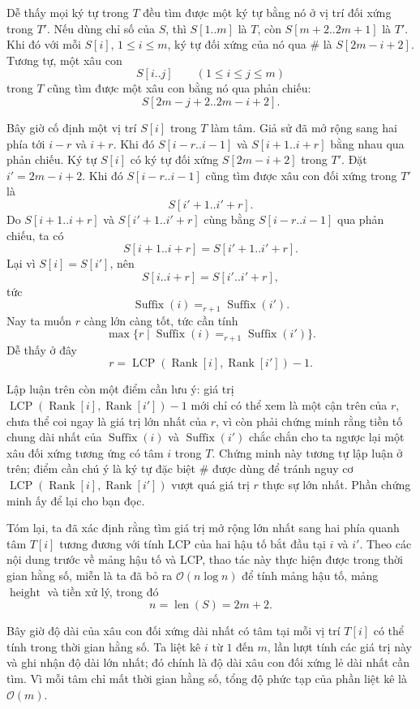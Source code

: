 \documentclass[11pt]{article}
\newcommand{\Oh}{\mathcal{O}}
\newcommand{\Rank}{\operatorname{Rank}}
\newcommand{\Height}{\operatorname{height}}
\newcommand{\Suf}{\operatorname{Suffix}}
\newcommand{\Len}{\operatorname{len}}
\newcommand{\LCP}{\operatorname{LCP}}
\begin{document}
Dễ thấy mọi ký tự trong \(T\) đều tìm được một ký tự bằng nó ở vị trí đối xứng
trong \(T'\). Nếu dùng chỉ số của \(S\), thì \(S[1..m]\) là \(T\), còn
\(S[m+2..2m+1]\) là \(T'\). Khi đó với mỗi \(S[i]\), \(1\le i\le m\), ký tự
đối xứng của nó qua \(\texttt{\#}\) là \(S[2m-i+2]\). Tương tự, một xâu con
\[
  S[i..j]\qquad (1\le i\le j\le m)
\]
trong \(T\) cũng tìm được một xâu con bằng nó qua phản chiếu:
\[
  S[2m-j+2..2m-i+2].
\]

Bây giờ cố định một vị trí \(S[i]\) trong \(T\) làm tâm. Giả sử đã mở rộng
sang hai phía tới \(i-r\) và \(i+r\). Khi đó \(S[i-r..i-1]\) và
\(S[i+1..i+r]\) bằng nhau qua phản chiếu. Ký tự \(S[i]\) có ký tự đối xứng
\(S[2m-i+2]\) trong \(T'\). Đặt \(i'=2m-i+2\). Khi đó
\(S[i-r..i-1]\) cũng tìm được xâu con đối xứng trong \(T'\) là
\[
  S[i'+1..i'+r].
\]
Do \(S[i+1..i+r]\) và \(S[i'+1..i'+r]\) cùng bằng \(S[i-r..i-1]\) qua phản
chiếu, ta có
\[
  S[i+1..i+r]=S[i'+1..i'+r].
\]
Lại vì \(S[i]=S[i']\), nên
\[
  S[i..i+r]=S[i'..i'+r],
\]
tức
\[
  \Suf(i)=_{r+1}\Suf(i').
\]
Nay ta muốn \(r\) càng lớn càng tốt, tức cần tính
\[
  \max\{r\mid \Suf(i)=_{r+1}\Suf(i')\}.
\]
Dễ thấy ở đây
\[
  r=\LCP(\Rank[i],\Rank[i'])-1.
\]

Lập luận trên còn một điểm cần lưu ý: giá trị \(\LCP(\Rank[i],\Rank[i'])-1\)
mới chỉ có thể xem là một cận trên của \(r\), chưa thể coi ngay là giá trị
lớn nhất của \(r\), vì còn phải chứng minh rằng tiền tố chung dài nhất của
\(\Suf(i)\) và \(\Suf(i')\) chắc chắn cho ta ngược lại một xâu đối xứng tương
ứng có tâm \(i\) trong \(T\). Chứng minh này tương tự lập luận ở trên; điểm
cần chú ý là ký tự đặc biệt \(\texttt{\#}\) được dùng để tránh nguy cơ
\(\LCP(\Rank[i],\Rank[i'])\) vượt quá giá trị \(r\) thực sự lớn nhất. Phần
chứng minh ấy để lại cho bạn đọc.

Tóm lại, ta đã xác định rằng tìm giá trị mở rộng lớn nhất sang hai phía quanh
tâm \(T[i]\) tương đương với tính LCP của hai hậu tố bắt đầu tại \(i\) và
\(i'\). Theo các nội dung trước về mảng hậu tố và LCP, thao tác này thực hiện
được trong thời gian hằng số, miễn là ta đã bỏ ra \(\Oh(n\log n)\) để tính
mảng hậu tố, mảng \(\Height\) và tiền xử lý, trong đó
\[
  n=\Len(S)=2m+2.
\]

Bây giờ độ dài của xâu con đối xứng dài nhất có tâm tại mỗi vị trí \(T[i]\)
có thể tính trong thời gian hằng số. Ta liệt kê \(i\) từ \(1\) đến \(m\), lần
lượt tính các giá trị này và ghi nhận độ dài lớn nhất; đó chính là độ dài xâu
con đối xứng lẻ dài nhất cần tìm. Vì mỗi tâm chỉ mất thời gian hằng số, tổng
độ phức tạp của phần liệt kê là \(\Oh(m)\).
\end{document}
